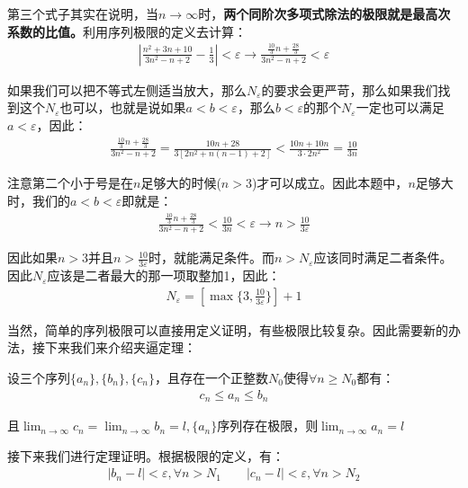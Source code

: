 \documentclass{ctexart}
\let\oldtextbf\textbf %
\renewcommand{\textbf}[1]{\textcolor{btex}{\oldtextbf{#1}}} %
\begin{document}
第三个式子其实在说明，当$n\to\infty$时，\textbf{\color{btex}两个同阶次多项式除法的极限就是最高次系数的比值。}利用序列极限的定义去计算：
\begin{align*}
    \left|\frac{n^2+3n+10}{3n^2-n+2}-\frac{1}{3}\right|<\varepsilon\to \frac{\frac{10}{3}n+\frac{28}{3}}{3n^2-n+2}<\varepsilon    
\end{align*}

如果我们可以把不等式左侧适当放大，那么$N_\varepsilon$的要求会更严苛，那么如果我们找到这个$N_\varepsilon$也可以，也就是说如果$a<b<\varepsilon$，那么$b<\varepsilon$的那个$N_\varepsilon$一定也可以满足$a<\varepsilon$，因此：
\begin{align*}
    \frac{\frac{10}{3}n+\frac{28}{3}}{3n^2-n+2}=\frac{10n+28}{3[2n^2+n(n-1)+2]}<\frac{10n+10n}{3\cdot 2n^2}=\frac{10}{3n}
\end{align*}

注意第二个小于号是在$n$足够大的时候($n>3$)才可以成立。因此本题中，$n$足够大时，我们的$a<b<\varepsilon$即就是：
\begin{align*}
     \frac{\frac{10}{3}n+\frac{28}{3}}{3n^2-n+2}<\frac{10}{3n}<\varepsilon\to n>\frac{10}{3\varepsilon}
\end{align*}

因此如果$n>3$并且$n>\frac{10}{3\varepsilon}$时，就能满足条件。而$n>N_\varepsilon$应该同时满足二者条件。因此$N_\varepsilon$应该是二者最大的那一项取整加1，因此：
\begin{align*}
    N_\varepsilon=[\max\{3,\frac{10}{3\varepsilon}\}]+1
\end{align*}

当然，简单的序列极限可以直接用定义证明，有些极限比较复杂。因此需要新的办法，接下来我们来介绍夹逼定理：
\begin{tcolorbox}[
    colback=bac2,     %
    colframe=fra2,   %
    coltitle=white,             %
    coltext=tex2,
    title=夹逼定理,
    fonttitle=\bfseries,        %
arc=3mm,                     %
breakable
]

设三个序列$\{a_n\},\{b_n\},\{c_n\}$，且存在一个正整数$N_0$使得$\forall n \geq N_0$都有：
\begin{align*}
    c_n\leq a_n\leq b_n
\end{align*}

且$\lim_{n\to\infty}c_n=\lim_{n\to\infty}b_n=l,\{a_n\}$序列存在极限，则$\lim_{n\to\infty}a_n=l$
\end{tcolorbox}

接下来我们进行定理证明。根据极限的定义，有：
\begin{align*}
 |b_n-l|<\varepsilon,\forall n>N_1\qquad |c_n-l|<\varepsilon,\forall n>N_2 
\end{align*}
\end{document}
